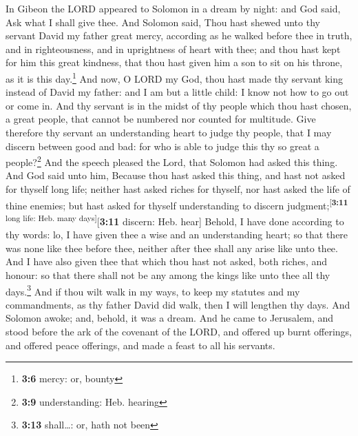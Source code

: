  In Gibeon the LORD appeared to Solomon in a dream by
night: and God said, Ask what I shall give thee.  And
Solomon said, Thou hast shewed unto thy servant David my father great
mercy, according as he walked before thee in truth, and in
righteousness, and in uprightness of heart with thee; and thou hast kept
for him this great kindness, that thou hast given him a son to sit on
his throne, as it is this day.\footnote{\textbf{3:6} mercy: or, bounty}
 And now, O LORD my God, thou hast made thy servant king
instead of David my father: and I am but a little child: I know not how
to go out or come in.  And thy servant is in the midst of
thy people which thou hast chosen, a great people, that cannot be
numbered nor counted for multitude.  Give therefore thy
servant an understanding heart to judge thy people, that I may discern
between good and bad: for who is able to judge this thy so great a
people?\footnote{\textbf{3:9} understanding: Heb. hearing}
 And the speech pleased the Lord, that Solomon had asked
this thing.  And God said unto him, Because thou hast
asked this thing, and hast not asked for thyself long life; neither hast
asked riches for thyself, nor hast asked the life of thine enemies; but
hast asked for thyself understanding to discern
judgment;\textsuperscript{{[}\textbf{3:11} long life: Heb. many
days{]}}{[}\textbf{3:11} discern: Heb. hear{]}  Behold, I
have done according to thy words: lo, I have given thee a wise and an
understanding heart; so that there was none like thee before thee,
neither after thee shall any arise like unto thee.  And I
have also given thee that which thou hast not asked, both riches, and
honour: so that there shall not be any among the kings like unto thee
all thy days.\footnote{\textbf{3:13} shall\ldots: or, hath not been}
 And if thou wilt walk in my ways, to keep my statutes
and my commandments, as thy father David did walk, then I will lengthen
thy days.  And Solomon awoke; and, behold, it was a
dream. And he came to Jerusalem, and stood before the ark of the
covenant of the LORD, and offered up burnt offerings, and offered peace
offerings, and made a feast to all his servants.

